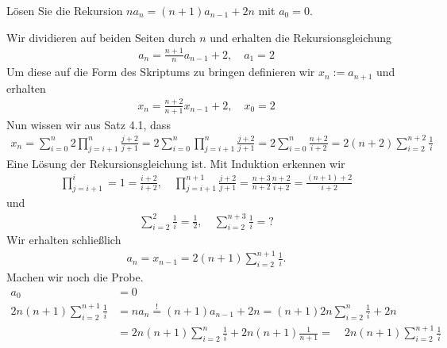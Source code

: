 
\begin{exercise}

	Lösen Sie die Rekursion $n a_n = (n + 1) a_{n - 1} + 2n$ mit $a_0 = 0$. 

\end{exercise}


\begin{solution}

	Wir dividieren auf beiden Seiten durch $n$ und erhalten die Rekursionsgleichung 
	\begin{align*}
	a_n = \frac{n + 1}{n} a_{n - 1} + 2, \quad a_1 = 2
	\end{align*}
	Um diese auf die Form des Skriptums zu bringen definieren wir $x_n := a_{n + 1}$ und erhalten 
	\begin{align*}
	x_n = \frac{n + 2}{n + 1} x_{n -1} + 2, \quad x_0 = 2
	\end{align*}
	Nun wissen wir aus Satz 4.1, dass 
	\begin{align*}
	x_n = \sum_{i = 0}^n 2 \prod_{j =  i + 1}^n \frac{j + 2}{j + 1}  = 2 \sum_{i = 0}^n \prod_{j =  i + 1}^n \frac{j + 2}{j + 1} = 2 \sum_{i = 0}^n \frac{n + 2}{i + 2} = 2 (n + 2) \sum_{i=2}^{n+2} \frac{1}{i} 
	\end{align*}
	Eine Lösung der Rekursionsgleichung ist. Mit Induktion erkennen wir
	\begin{align*}
	\prod_{j=i+1}^i = 1 = \frac{i + 2}{i + 2}, \quad \prod_{j = i+1}^{n + 1} \frac{j + 2}{j + 1} = \frac{n + 3}{n + 2} \frac{n + 2}{i + 2} = \frac{(n + 1) + 2}{i + 2}
	\end{align*}
	und 
	\begin{align*}
	\sum_{i = 2}^2 \frac{1}{i} = \frac{1}{2}, \quad \sum_{i = 2}^{n + 3} \frac{1}{i} = ?
	\end{align*}
	Wir erhalten schließlich
	\begin{align*}
	a_n = x_{n - 1} = 2 (n + 1) \sum_{i = 2}^{n + 1} \frac{1}{i}.
	\end{align*}
	Machen wir noch die Probe.
	\begin{align*}
	a_0 &= 0 \\ 
	2n(n + 1) \sum_{i = 2}^{n + 1} \frac{1}{i} &= n a_n \stackrel{!}{=} (n + 1) a_{n - 1} + 2n = (n + 1) 2n \sum_{i = 2}^{n} \frac{1}{i} + 2n \\
	&= 2n (n + 1)  \sum_{i = 2}^{n} \frac{1}{i} + 2n (n + 1) \frac{1}{n + 1} = \quad 2n(n + 1) \sum_{i = 2}^{n + 1} \frac{1}{i}
	\end{align*}
\end{solution}

